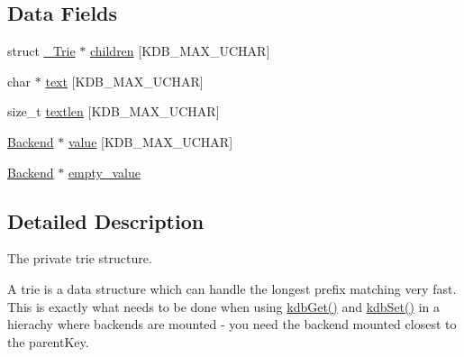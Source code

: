 \subsection*{Data Fields}
\begin{DoxyCompactItemize}
\item 
struct \hyperlink{struct__Trie}{\_\-Trie} $\ast$ \hyperlink{struct__Trie_a75a95fbbe3775dee9270ad85bfe8e407}{children} \mbox{[}KDB\_\-MAX\_\-UCHAR\mbox{]}
\item 
char $\ast$ \hyperlink{struct__Trie_ad3ba18c413ba4fd9e91e3ff9b4ce8fcf}{text} \mbox{[}KDB\_\-MAX\_\-UCHAR\mbox{]}
\item 
size\_\-t \hyperlink{struct__Trie_a619b7bda11987e2e615d63ea06d41d4c}{textlen} \mbox{[}KDB\_\-MAX\_\-UCHAR\mbox{]}
\item 
\hyperlink{struct__Backend}{Backend} $\ast$ \hyperlink{struct__Trie_a59000b73324788bb15eb659ceb76bd75}{value} \mbox{[}KDB\_\-MAX\_\-UCHAR\mbox{]}
\item 
\hyperlink{struct__Backend}{Backend} $\ast$ \hyperlink{struct__Trie_ac5c6b4bddcccb23eb0bd26ffade7eb43}{empty\_\-value}
\end{DoxyCompactItemize}


\subsection{Detailed Description}
The private trie structure.

A trie is a data structure which can handle the longest prefix matching very fast. This is exactly what needs to be done when using \hyperlink{group__kdb_ga28e385fd9cb7ccfe0b2f1ed2f62453a1}{kdbGet()} and \hyperlink{group__kdb_ga11436b058408f83d303ca5e996832bcf}{kdbSet()} in a hierachy where backends are mounted -\/ you need the backend mounted closest to the parentKey. 

